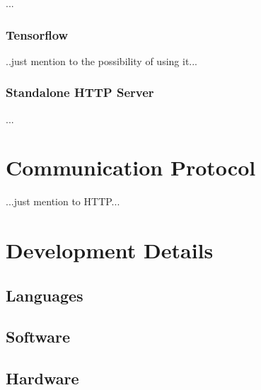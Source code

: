 \documentclass{scrreprt}
\begin{document}
...
\subsection{Tensorflow}

..just mention to the possibility of using it...

\subsection{Standalone HTTP Server}

...

\chapter{Communication Protocol}

...just mention to HTTP...


\chapter{Development Details}

\section{Languages}
\section{Software}
\section{Hardware}
\end{document}
